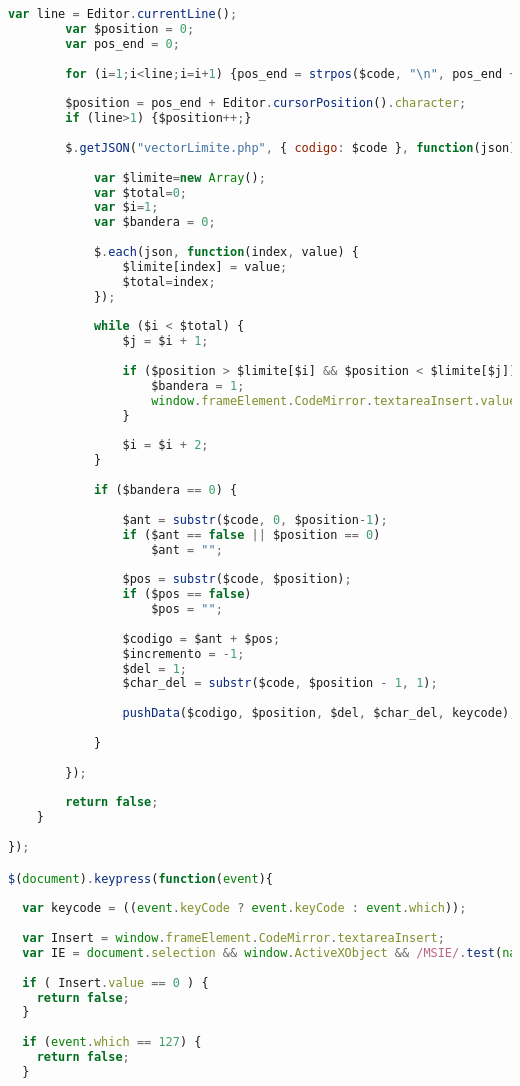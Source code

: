 \begin{lstlisting}[language=Javascript]
		var line = Editor.currentLine();
	 	var $position = 0;
	 	var pos_end = 0;
	
	 	for (i=1;i<line;i=i+1) {pos_end = strpos($code, "\n", pos_end + 1);}
  	
		$position = pos_end + Editor.cursorPosition().character;
		if (line>1) {$position++;}
     	
		$.getJSON("vectorLimite.php", { codigo: $code }, function(json){
  	
        	var $limite=new Array();
        	var $total=0;
        	var $i=1;
        	var $bandera = 0;
  	   
  	    	$.each(json, function(index, value) { 
               	$limite[index] = value;
  			   	$total=index;
        	});
	   
	    	while ($i < $total) {
	   	   		$j = $i + 1;
	   	 
           		if ($position > $limite[$i] && $position < $limite[$j]) {
	   	      		$bandera = 1;
	   	      		window.frameElement.CodeMirror.textareaInsert.value = 1;
	   	   		}
	   	 
	   	   		$i = $i + 2;
	    	}
	    	
	    	if ($bandera == 0) {
	    	
	    		$ant = substr($code, 0, $position-1);
	    		if ($ant == false || $position == 0)
	   	    		$ant = "";
	   	      
				$pos = substr($code, $position);
				if ($pos == false)
	   	    		$pos = "";
	   	         
	   			$codigo = $ant + $pos;
	   	 		$incremento = -1;
	   	    	$del = 1;
	   	    	$char_del = substr($code, $position - 1, 1);
	   	    	
	   	    	pushData($codigo, $position, $del, $char_del, keycode);
	   	    
	   	   	}
	   	   
		});
		
		return false;	
	}
	
});

$(document).keypress(function(event){ 
	
  var keycode = ((event.keyCode ? event.keyCode : event.which));
	
  var Insert = window.frameElement.CodeMirror.textareaInsert;
  var IE = document.selection && window.ActiveXObject && /MSIE/.test(navigator.userAgent);
  
  if ( Insert.value == 0 ) {
  	return false;
  }
  
  if (event.which == 127) {
  	return false;
  }
  

\end{lstlisting}
